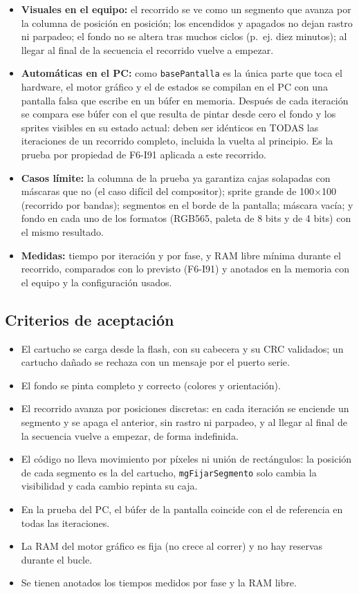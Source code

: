 \begin{itemize}
	\item \textbf{Visuales en el equipo:} el recorrido se ve como un segmento que avanza por la columna de posición en posición; los encendidos y apagados no dejan rastro ni parpadeo; el fondo no se altera tras muchos ciclos (p.~ej. diez minutos); al llegar al final de la secuencia el recorrido vuelve a empezar.
	\item \textbf{Automáticas en el PC:} como \texttt{basePantalla} es la única parte que toca el hardware, el motor gráfico y el de estados se compilan en el PC con una pantalla falsa que escribe en un búfer en memoria. Después de cada iteración se compara ese búfer con el que resulta de pintar desde cero el fondo y los sprites visibles en su estado actual: deben ser idénticos en TODAS las iteraciones de un recorrido completo, incluida la vuelta al principio. Es la prueba por propiedad de F6-I91 aplicada a este recorrido.
	\item \textbf{Casos límite:} la columna de la prueba ya garantiza cajas solapadas con máscaras que no (el caso difícil del compositor); sprite grande de 100$\times$100 (recorrido por bandas); segmentos en el borde de la pantalla; máscara vacía; y fondo en cada uno de los formatos (RGB565, paleta de 8 bits y de 4 bits) con el mismo resultado.
	\item \textbf{Medidas:} tiempo por iteración y por fase, y RAM libre mínima durante el recorrido, comparados con lo previsto (F6-I91) y anotados en la memoria con el equipo y la configuración usados.
\end{itemize}

\subsection{Criterios de aceptación}
\label{sec:F6I92Criterios}

\begin{itemize}
	\item El cartucho se carga desde la flash, con su cabecera y su CRC validados; un cartucho dañado se rechaza con un mensaje por el puerto serie.
	\item El fondo se pinta completo y correcto (colores y orientación).
	\item El recorrido avanza por posiciones discretas: en cada iteración se enciende un segmento y se apaga el anterior, sin rastro ni parpadeo, y al llegar al final de la secuencia vuelve a empezar, de forma indefinida.
	\item El código no lleva movimiento por píxeles ni unión de rectángulos: la posición de cada segmento es la del cartucho, \texttt{mgFijarSegmento} solo cambia la visibilidad y cada cambio repinta su caja.
	\item En la prueba del PC, el búfer de la pantalla coincide con el de referencia en todas las iteraciones.
	\item La RAM del motor gráfico es fija (no crece al correr) y no hay reservas durante el bucle.
	\item Se tienen anotados los tiempos medidos por fase y la RAM libre.
\end{itemize}

